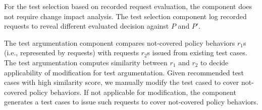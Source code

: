 For the test selection based on recorded request evaluation,
the component does not require change impact analysis. The test selection
component log recorded requests to reveal different evaluated decision against $P$ and $P'$.

The test argumentation component compares
not-covered policy behaviors $r_1$s (i.e., represented by requests) with requests $r_2$s
issued from existing test cases. The test argumentation computes
similarity between $r_1$ and $r_2$ to decide applicability of modification for test
argumentation. Given recommended test cases with high similarity score,
we manually modify the test cased to cover not-covered policy behaviors. 
If not applicable for modification, the component
generates a test cases to issue such requests to cover not-covered policy behaviors. 



